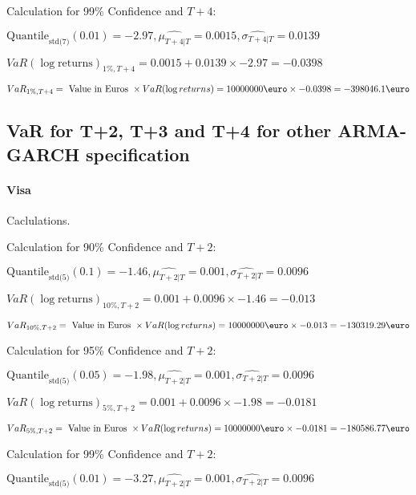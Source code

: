 Calculation for 99\% Confidence and $T+4$:

\indent\indent $\text{Quantile}_\text{std(7)}(0.01) = -2.97,\hat{\mu_{T+4|T}} = 0.0015, \hat{\sigma_{T+4|T}} = 0.0139$

\indent\indent $VaR(\log \text{returns})_{1\%, T + 4} = 0.0015 + 0.0139\times-2.97 = -0.0398$

\indent\indent $VaR_{1\%, T + 4} = \text{ Value in Euros } \times VaR(\log returns) = 10 000 000 \text{\euro} \times-0.0398 = -398046.1 \text{\euro}$\newline
\subsection{VaR for T+2, T+3 and T+4 for other ARMA-GARCH specification}
\paragraph{Visa} Caclulations.\newline \indent 





Calculation for 90\% Confidence and $T+2$:

\indent\indent $\text{Quantile}_\text{std(5)}(0.1) = -1.46,\hat{\mu_{T+2|T}} = 0.001, \hat{\sigma_{T+2|T}} = 0.0096$

\indent\indent $VaR(\log \text{returns})_{10\%, T + 2} = 0.001 + 0.0096\times-1.46 = -0.013$

\indent\indent $VaR_{10\%, T + 2} = \text{ Value in Euros } \times VaR(\log returns) = 10 000 000 \text{\euro} \times-0.013 = -130319.29 \text{\euro}$\newline




Calculation for 95\% Confidence and $T+2$:

\indent\indent $\text{Quantile}_\text{std(5)}(0.05) = -1.98,\hat{\mu_{T+2|T}} = 0.001, \hat{\sigma_{T+2|T}} = 0.0096$

\indent\indent $VaR(\log \text{returns})_{5\%, T + 2} = 0.001 + 0.0096\times-1.98 = -0.0181$

\indent\indent $VaR_{5\%, T + 2} = \text{ Value in Euros } \times VaR(\log returns) = 10 000 000 \text{\euro} \times-0.0181 = -180586.77 \text{\euro}$\newline




Calculation for 99\% Confidence and $T+2$:

\indent\indent $\text{Quantile}_\text{std(5)}(0.01) = -3.27,\hat{\mu_{T+2|T}} = 0.001, \hat{\sigma_{T+2|T}} = 0.0096$

